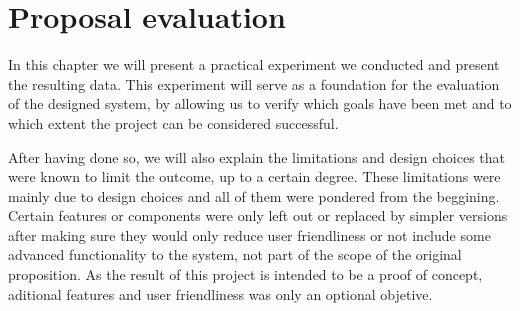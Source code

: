 \chapter{Proposal evaluation} \label{chap:eval}
In this chapter we will present a practical experiment we conducted and present the resulting data.
This experiment will serve as a foundation for the evaluation of the designed system, by allowing us to verify which goals have been met and to which extent the project can be considered successful.

After having done so, we will also explain the limitations and design choices that were known to limit the outcome, up to a certain degree.
These limitations were mainly due to design choices and all of them were pondered from the beggining.
Certain features or components were only left out or replaced by simpler versions after making sure they would only reduce user friendliness or not include some advanced functionality to the system, not part of the scope of the original proposition.
As the result of this project is intended to be a proof of concept, aditional features and user friendliness was only an optional objetive.




